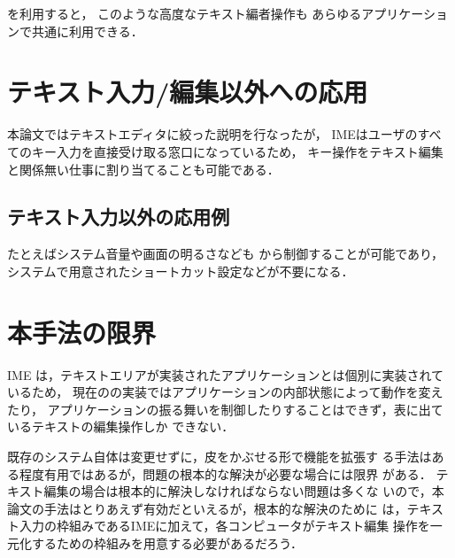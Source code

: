{\system}を利用すると，
このような高度なテキスト編者操作も
あらゆるアプリケーションで共通に利用できる．

\section{テキスト入力/編集以外への応用}

本論文ではテキストエディタに絞った説明を行なったが，
IMEはユーザのすべてのキー入力を直接受け取る窓口になっているため，
キー操作をテキスト編集と関係無い仕事に割り当てることも可能である．
%
\subsection{テキスト入力以外の応用例}
たとえばシステム音量や画面の明るさなども
{\system}から制御することが可能であり，
システムで用意されたショートカット設定などが不要になる．

\section{本手法の限界}

IME は，テキストエリアが実装されたアプリケーションとは個別に実装されているため，
現在の{\system}の実装ではアプリケーションの内部状態によって動作を変えたり，
アプリケーションの振る舞いを制御したりすることはできず，表に出ているテキストの編集操作しか
できない．

%
既存のシステム自体は変更せずに，皮をかぶせる形で機能を拡張す
る手法はある程度有用ではあるが，問題の根本的な解決が必要な場合には限界
がある．
%
テキスト編集の場合は根本的に解決しなければならない問題は多くな
いので，本論文の手法はとりあえず有効だといえるが，根本的な解決のために
は，テキスト入力の枠組みであるIMEに加えて，各コンピュータがテキスト編集
操作を一元化するための枠組みを用意する必要があるだろう．
